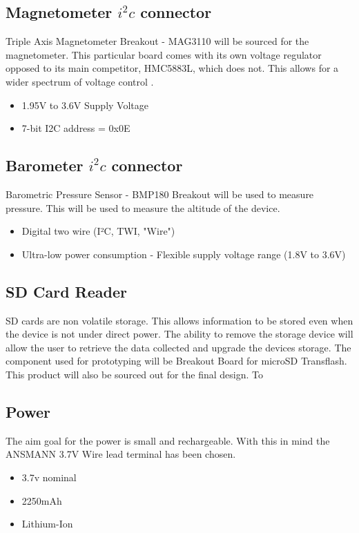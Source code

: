 \documentclass{report}
\begin{document}
\subsection{Magnetometer $i^2c$ connector}
Triple Axis Magnetometer Breakout - MAG3110 will be sourced for the magnetometer. This particular board comes with its own voltage regulator opposed to its main competitor, HMC5883L, which does not. This allows for a wider spectrum of voltage control .
\begin{itemize}
\item 1.95V to 3.6V Supply Voltage
\item 7-bit I2C address = 0x0E
\end{itemize}

\subsection{Barometer $i^2c$ connector}
Barometric Pressure Sensor - BMP180 Breakout will be used to measure pressure. This will be used to measure the altitude of the device. 
\begin{itemize}
\item Digital two wire (I²C, TWI, "Wire")
\item Ultra-low power consumption - Flexible supply voltage range (1.8V to 3.6V)
\end{itemize}

\subsection{SD Card Reader}
SD cards are non volatile storage. This allows information to be stored even when the device is not under direct power. The ability to remove the storage device will allow the user to retrieve the data collected and upgrade the devices storage. The component used for prototyping will be Breakout Board for microSD Transflash. This product will also be sourced out for the final design.
To 

\subsection{Power}
The aim goal for the power is small and rechargeable. With this in mind the ANSMANN 3.7V Wire lead terminal has been chosen.
\begin{itemize}
\item 3.7v nominal
\item 2250mAh
\item Lithium-Ion
\end{itemize}
\end{document}
